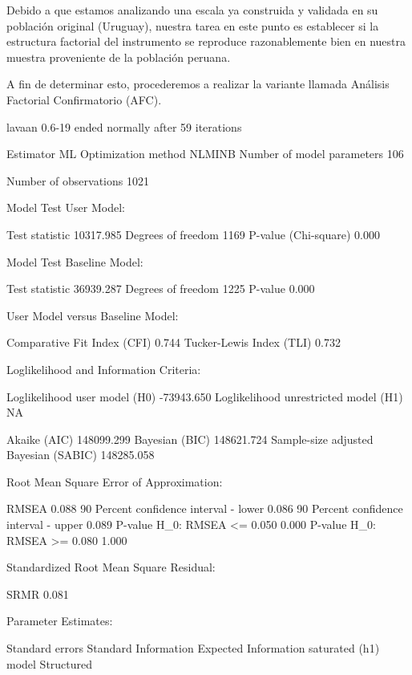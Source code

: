 \documentclass[
]{article}
\begin{document}
Debido a que estamos analizando una escala ya construida y validada en
su población original (Uruguay), nuestra tarea en este punto es
establecer si la estructura factorial del instrumento se reproduce
razonablemente bien en nuestra muestra proveniente de la población
peruana.

A fin de determinar esto, procederemos a realizar la variante llamada
Análisis Factorial Confirmatorio (AFC).

lavaan 0.6-19 ended normally after 59 iterations

Estimator ML Optimization method NLMINB Number of model parameters 106

Number of observations 1021

Model Test User Model:

Test statistic 10317.985 Degrees of freedom 1169 P-value (Chi-square)
0.000

Model Test Baseline Model:

Test statistic 36939.287 Degrees of freedom 1225 P-value 0.000

User Model versus Baseline Model:

Comparative Fit Index (CFI) 0.744 Tucker-Lewis Index (TLI) 0.732

Loglikelihood and Information Criteria:

Loglikelihood user model (H0) -73943.650 Loglikelihood unrestricted
model (H1) NA

Akaike (AIC) 148099.299 Bayesian (BIC) 148621.724 Sample-size adjusted
Bayesian (SABIC) 148285.058

Root Mean Square Error of Approximation:

RMSEA 0.088 90 Percent confidence interval - lower 0.086 90 Percent
confidence interval - upper 0.089 P-value H\_0: RMSEA \textless= 0.050
0.000 P-value H\_0: RMSEA \textgreater= 0.080 1.000

Standardized Root Mean Square Residual:

SRMR 0.081

Parameter Estimates:

Standard errors Standard Information Expected Information saturated (h1)
model Structured
\end{document}
